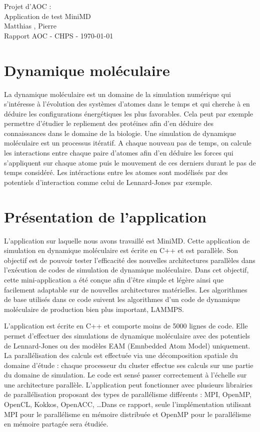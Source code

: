 \documentclass[11pt,a4paper]{article}
\begin{document}
\begin{center}

	{\LARGE\centering Projet d'AOC :\\ Application de test MiniMD}\\[1cm]

	{ Matthias , Pierre }\\[0.5cm]
	{Rapport AOC - CHPS - \today}\\[2cm]
\end{center}

\tableofcontents
\newpage

\section{Dynamique moléculaire}
	La dynamique moléculaire est un domaine de la simulation numérique qui s'intéresse à l'évolution des systèmes d'atomes dans le temps et qui cherche à en déduire les configurations énergétiques les plus favorables. Cela peut par exemple permettre d'étudier le repliement des protéines afin d'en déduire des connaissances dans le domaine de la biologie.
	Une simulation de dynamique moléculaire est un processus itératif. A chaque nouveau pas de temps, on calcule les interactions entre chaque paire d'atomes afin d'en déduire les forces qui s'appliquent sur chaque atome puis le mouvement de ces derniers durant le pas de temps considéré. Les intéractions entre les atomes sont modélisés par des potentiels d'interaction comme celui de Lennard-Jones par exemple.

\section{Présentation de l'application}
	L'application sur laquelle nous avons travaillé est MiniMD. Cette application de simulation en dynamique moléculaire est écrite en C++ et est parallèle. Son objectif est de pouvoir tester l'efficacité des nouvelles architectures parallèles dans l'exécution de codes de simulation de dynamique moléculaire. Dans cet objectif, cette mini-application a été conçue afin d'être simple et légère ainsi que facilement adaptable sur de nouvelles architectures matérielles. Les algorithmes de base utilisés dans ce code suivent les algorithmes d'un code de dynamique moléculaire de production bien plus important, LAMMPS.

	L'application est écrite en C++ et comporte moins de 5000 lignes de code. Elle permet d'effectuer des simulations de dynamique moléculaire avec des potentiels de Lennard-Jones ou des modèles EAM (Emnbedded Atom Model) uniquement. La parallélisation des calculs est effectuée via une décomposition spatiale du domaine d'étude : chaque processeur du cluster effectue ses calculs sur une partie du domaine de simulation. Le code est sensé passer correctement à l'échelle  sur une architecture parallèle. L'application peut fonctionner avec plusieurs librairies de parallélisation proposant des types de parallélisme différents : MPI, OpenMP, OpenCL, Kokkos, OpenACC, \ldots Dans ce rapport, seule l'implémentation utilisant MPI pour le parallélisme en mémoire distribuée et OpenMP pour le parallélisme en mémoire partagée sera étudiée.
\end{document}
